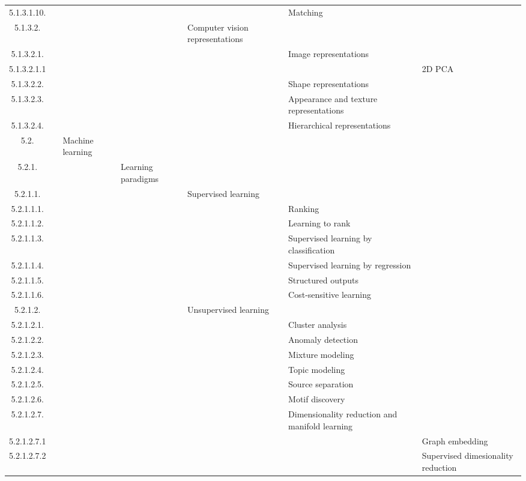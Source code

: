\documentclass[12pt]{article}
\begin{document}
\begin{center}
{\begin{tabularx}{\linewidth}{|c|X|X|X|X|X|X|}
		5.1.3.1.10. &   &   &   &   &  Matching &   \\
		5.1.3.2. &   &   &   &  Computer vision representations &   &   \\
		5.1.3.2.1. &   &   &   &   &  Image representations &   \\
		5.1.3.2.1.1 &   &   &   &   &   &  2D PCA \\
		5.1.3.2.2. &   &   &   &   &  Shape representations &   \\
		5.1.3.2.3. &   &   &   &   &  Appearance and texture representations &   \\
		5.1.3.2.4. &   &   &   &   &  Hierarchical representations &   \\
		5.2. &   &  Machine learning &   &   &   &   \\
		5.2.1. &   &   &  Learning paradigms &   &   &   \\
		5.2.1.1. &   &   &   &  Supervised learning &   &   \\
		5.2.1.1.1. &   &   &   &   &  Ranking &   \\
		5.2.1.1.2. &   &   &   &   &  Learning to rank &   \\
		5.2.1.1.3. &   &   &   &   &  Supervised learning by classification &   \\
		5.2.1.1.4. &   &   &   &   &  Supervised learning by regression &   \\
		5.2.1.1.5. &   &   &   &   &  Structured outputs &   \\
		5.2.1.1.6. &   &   &   &   &  Cost-sensitive learning &   \\
		5.2.1.2. &   &   &   &  Unsupervised learning &   &   \\
		5.2.1.2.1. &   &   &   &   &  Cluster analysis &   \\
		5.2.1.2.2. &   &   &   &   &  Anomaly detection &   \\
		5.2.1.2.3. &   &   &   &   &  Mixture modeling &   \\
		5.2.1.2.4. &   &   &   &   &  Topic modeling &   \\
		5.2.1.2.5. &   &   &   &   &  Source separation &   \\
		5.2.1.2.6. &   &   &   &   &  Motif discovery &   \\
		5.2.1.2.7. &   &   &   &   &  Dimensionality reduction and manifold learning &   \\
		5.2.1.2.7.1 &   &   &   &   &   &  Graph embedding \\
		5.2.1.2.7.2 &   &   &   &   &   &  Supervised dimesionality reduction \\

\end{tabularx}}
\end{center}
\end{document}
